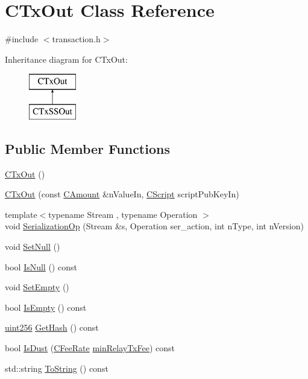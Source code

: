 \hypertarget{class_c_tx_out}{}\section{C\+Tx\+Out Class Reference}
\label{class_c_tx_out}


{\ttfamily \#include $<$transaction.\+h$>$}

Inheritance diagram for C\+Tx\+Out\+:\begin{figure}[H]
\begin{center}
\leavevmode
\includegraphics[height=2.000000cm]{class_c_tx_out}
\end{center}
\end{figure}
\subsection*{Public Member Functions}
\begin{DoxyCompactItemize}
\item 
\hyperlink{class_c_tx_out_a46110a759b21c75968297768f759be59}{C\+Tx\+Out} ()
\item 
\hyperlink{class_c_tx_out_adc5daeba4e26f1807cee8ec3cc138ef8}{C\+Tx\+Out} (const \hyperlink{amount_8h_a4eaf3a5239714d8c45b851527f7cb564}{C\+Amount} \&n\+Value\+In, \hyperlink{class_c_script}{C\+Script} script\+Pub\+Key\+In)
\item 
{\footnotesize template$<$typename Stream , typename Operation $>$ }\\void \hyperlink{class_c_tx_out_a88e5e2f069325d6bb1936ee75935f121}{Serialization\+Op} (Stream \&s, Operation ser\+\_\+action, int n\+Type, int n\+Version)
\item 
void \hyperlink{class_c_tx_out_a9fe5e6a1be651f130d3dc84a64e78a24}{Set\+Null} ()
\item 
bool \hyperlink{class_c_tx_out_aeaa6b16e0c4caee54196cf8eb0f127f3}{Is\+Null} () const 
\item 
void \hyperlink{class_c_tx_out_aef15a8068187af08b25a7ddfbf8d7744}{Set\+Empty} ()
\item 
bool \hyperlink{class_c_tx_out_ad755fbfcb5c816e21533cc062fcf6ee8}{Is\+Empty} () const 
\item 
\hyperlink{classuint256}{uint256} \hyperlink{class_c_tx_out_afae2ca52efebb049e3af78edc8332e8d}{Get\+Hash} () const 
\item 
bool \hyperlink{class_c_tx_out_aebf080be8a28855321e3581dfe3abcaf}{Is\+Dust} (\hyperlink{class_c_fee_rate}{C\+Fee\+Rate} \hyperlink{main_8h_a5925a10baeee7d4bdce1982bdcbd3bd0}{min\+Relay\+Tx\+Fee}) const 
\item 
std\+::string \hyperlink{class_c_tx_out_aee479c0d4a3786c44e2bc4c35d93b105}{To\+String} () const 
\end{DoxyCompactItemize}
